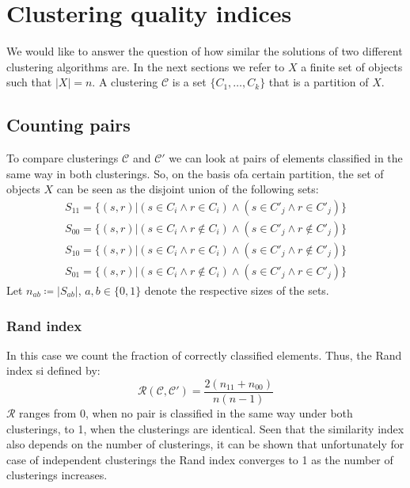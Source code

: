 \section{Clustering quality indices}\label{results_indices}
We would like to answer the question of how similar the solutions of two different clustering algorithms are. In the next sections we refer to $X$ a finite set of objects such that $|X|=n$. A clustering $\mathcal{C}$ is a set $\{C_1,\dots,C_k\}$ that is a partition of $X$.

\subsection{Counting pairs}
To compare clusterings $\mathcal{C}$ and $\mathcal{C}'$ we can look at pairs of elements classified in the same way in both clusterings. So, on the basis ofa certain partition, the set of objects $X$ can be seen as the disjoint union of the following sets:
\begin{equation*}
    \begin{gathered}
        S_{11}=\{(s,r)|(s\in C_i\land r\in C_i) \land (s\in C'_j\land r\in C'_j)\}\\
        S_{00}=\{(s,r)|(s\in C_i\land r\notin C_i) \land (s\in C'_j\land r\notin C'_j)\}\\
        S_{10}=\{(s,r)|(s\in C_i\land r\in C_i) \land (s\in C'_j\land r\notin C'_j)\}\\
        S_{01}=\{(s,r)|(s\in C_i\land r\notin C_i) \land (s\in C'_j\land r\in C'_j)\}
    \end{gathered}
\end{equation*}
Let $n_{ab}\coloneqq|S_{ab}|$, $a,b\in\{0,1\}$ denote the respective sizes of the sets.
\subsubsection{Rand index}
In this case we count the fraction of correctly classified elements. Thus, the Rand index si defined by:
\begin{equation*}
    \mathcal{R}(\mathcal{C},\mathcal{C}')=\frac{2(n_{11}+n_{00})}{n(n-1)}
\end{equation*}
$\mathcal{R}$ ranges from 0, when no pair is classified in the same way under both clusterings, to 1, when the clusterings are identical. Seen that the similarity index also depends on the number of clusterings, it can be shown that unfortunately for case of independent clusterings the Rand index converges to 1 as the number of clusterings increases.

